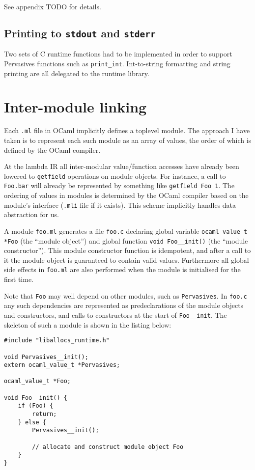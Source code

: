 \documentclass[12pt,a4paper,twoside,openright]{report}
\begin{document}
See appendix TODO for details.

\subsection{Printing to \lstinline!stdout! and \lstinline!stderr!}

Two sets of C runtime functions had to be implemented in order to support Pervasives functions such as \lstinline!print_int!. Int-to-string formatting and string printing are all delegated to the runtime library.

\section{Inter-module linking}

Each \lstinline!.ml! file in OCaml implicitly defines a toplevel module. The approach I have taken is to represent each such module as an array of values, the order of which is defined by the OCaml compiler.

At the lambda IR all inter-modular value/function accesses have already been lowered to \lstinline!getfield! operations on module objects. For instance, a call to \lstinline!Foo.bar! will already be represented by something like \lstinline!getfield Foo 1!. The ordering of values in modules is determined by the OCaml compiler based on the module's interface (\lstinline!.mli! file if it exists). This scheme implicitly handles data abstraction for us.

A module \lstinline!foo.ml! generates a file \lstinline!foo.c! declaring global variable \lstinline!ocaml_value_t *Foo! (the ``module object'') and global function \lstinline!void Foo__init()! (the ``module constructor''). This module constructor function is idempotent, and after a call to it the module object is guaranteed to contain valid values. Furthermore all global side effects in \lstinline!foo.ml! are also performed when the module is initialised for the first time.

Note that \lstinline!Foo! may well depend on other modules, such as \lstinline!Pervasives!. In \lstinline!foo.c! any such dependencies are represented as predeclarations of the module objects and constructors, and calls to constructors at the start of \lstinline!Foo__init!. The skeleton of such a module is shown in the listing below:

\begin{lstlisting}
#include "liballocs_runtime.h"

void Pervasives__init();
extern ocaml_value_t *Pervasives;

ocaml_value_t *Foo;

void Foo__init() {
    if (Foo) {
        return;
    } else {
        Pervasives__init();

        // allocate and construct module object Foo
    }
}
\end{lstlisting}
\end{document}
